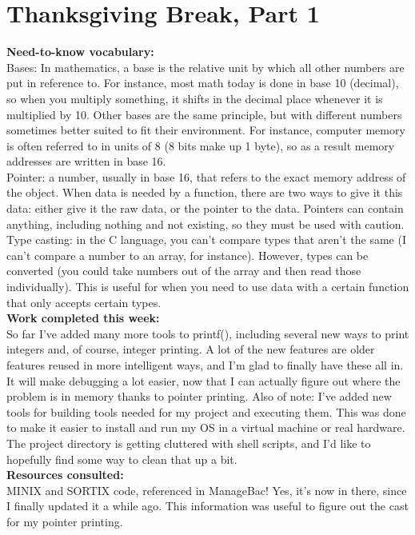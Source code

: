 \documentclass[11pt]{article}
\begin{document}
\section{Thanksgiving Break, Part 1}
\textbf{Need-to-know vocabulary:}\\
Bases: In mathematics, a base is the relative unit by which all other numbers are put in reference to. For instance, most math today is done in base 10 (decimal), so when you multiply something, it shifts in the decimal place whenever it is multiplied by 10. Other bases are the same principle, but with different numbers sometimes better suited to fit their environment. For instance, computer memory is often referred to in units of 8 (8 bits make up 1 byte), so as a result memory addresses are written in base 16.\\
Pointer: a number, usually in base 16, that refers to the exact memory address of the object. When data is needed by a function, there are two ways to give it this data: either give it the raw data, or the pointer to the data. Pointers can contain anything, including nothing and not existing, so they must be used with caution.
Type casting: in the C language, you can't compare types that aren't the same (I can't compare a number to an array, for instance). However, types can be converted (you could take numbers out of the array and then read those individually). This is useful for when you need to use data with a certain function that only accepts certain types.\\
\textbf{Work completed this week:}\\
So far I've added many more tools to printf(), including several new ways to print integers and, of course, integer printing. A lot of the new features are older features reused in more intelligent ways, and I'm glad to finally have these all in. It will make debugging a lot easier, now that I can actually figure out where the problem is in memory thanks to pointer printing. Also of note: I've added new tools for building tools needed for my project and executing them. This was done to make it easier to install and run my OS in a virtual machine or real hardware. The project directory is getting cluttered with shell scripts, and I'd like to hopefully find some way to clean that up a bit.\\
\textbf{Resources consulted:}\\
MINIX and SORTIX code, referenced in ManageBac! Yes, it's now in there, since I finally updated it a while ago. This information was useful to figure out the cast for my pointer printing.\\
\end{document}
